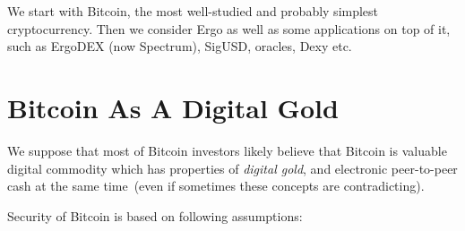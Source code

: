 \documentclass{article}   %
\begin{document}
We start with Bitcoin, the most well-studied and probably simplest cryptocurrency. Then we consider Ergo as well as some
applications on top of it, such as ErgoDEX (now Spectrum), SigUSD, oracles, Dexy etc. 


\section{Bitcoin As A Digital Gold}

We suppose that most of Bitcoin investors likely believe that Bitcoin is valuable digital commodity which has properties of {\em digital gold}, and electronic peer-to-peer cash at the same time~(even if sometimes these concepts are contradicting). 

Security of Bitcoin is based on following assumptions:
\end{document}
